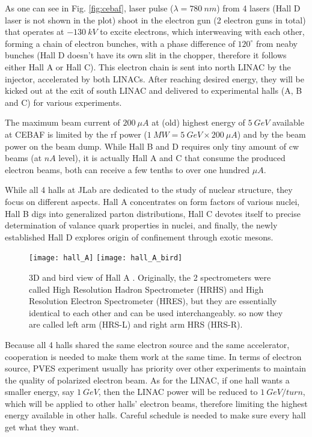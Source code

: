 As one can see in Fig. \ref{fig:cebaf}, laser pulse ($\lambda = 780 \ nm$) from 4 lasers 
(Hall D laser is not shown in the plot) shoot in the electron gun 
(2 electron guns in total) that 
operates at $-130\ kV$ to excite electrons, which interweaving with each other, 
forming a chain of electron bunches, with a phase difference of $120^\circ$ from 
neaby bunches (Hall D doesn't have its own slit in the chopper, therefore 
it follows either Hall A or Hall C). This electron chain is sent into north LINAC
by the injector, accelerated by both LINACs. After reaching desired energy,
they will be kicked out at the exit of south LINAC and delivered to experimental
halls (A, B and C) for various experiments. 

The maximum beam current of $200\ \mu A$ at (old) highest energy of $5\ GeV$ 
available at CEBAF is limited by the rf power ($1\ MW = 5\ GeV \times 200\ \mu A$) 
and by the beam power on the beam dump. While Hall B and D requires only tiny 
amount of cw beams (at $nA$ level), it is actually Hall A and C that consume 
the produced electron beams, both can receive a few tenths to over one 
hundred $\mu A$.

While all 4 halls at JLab are dedicated to the study of nuclear structure, they
focus on different aspects. Hall A concentrates on form factors of various nuclei, 
Hall B digs into generalized parton distributions, Hall C devotes itself to precise
determination of valance quark properties in nuclei, and finally, the newly 
established Hall D explores origin of confinement through exotic mesons.
\begin{figure}[h!]
    \centering
    \texttt{[image: hall\_A]}
    \texttt{[image: hall\_A\_bird]}
    \caption{3D and bird view of Hall A \cite{halla_manual}. Originally, the 2 spectrometers
    were called High Resolution Hadron Spectrometer (HRHS) and High Resolution Electron
    Spectrometer (HRES), but they are essentially identical to each other and
    can be used interchangeably.
    so now they are called left arm (HRS-L) and right arm HRS (HRS-R).
    }
\end{figure}

Because all 4 halls shared the same electron source and the same accelerator, 
cooperation is needed to make them work at the same time. In terms of electron
source, PVES experiment usually has priority over other experiments to maintain 
the quality of polarized electron beam. As for the LINAC, if one hall wants
a smaller energy, say $1\ GeV$, then the LINAC power will be reduced to $1\ GeV/turn$,
which will be applied to other halls' electron beams, therefore limiting the 
highest energy available in other halls. Careful schedule is needed to make sure
every hall get what they want.
